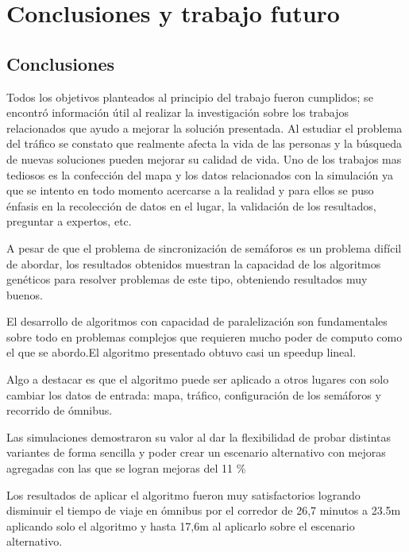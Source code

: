 \chapter{Conclusiones y trabajo futuro}

\section{Conclusiones}
Todos los objetivos planteados al principio del trabajo fueron cumplidos; se encontró información útil al realizar la investigación sobre los trabajos relacionados que ayudo a mejorar la solución presentada. 
Al estudiar el problema del tráfico se constato que realmente afecta la vida de las personas y la búsqueda de nuevas soluciones pueden mejorar su calidad de vida.
Uno de los trabajos mas tediosos es la confección del mapa y los datos relacionados con la simulación ya que se intento en todo momento acercarse a la realidad y para ellos se puso énfasis en la recolección de datos en el lugar, la validación de los resultados, preguntar a expertos, etc.



 
A pesar de que el problema de sincronización de semáforos es un problema difícil de abordar, los resultados obtenidos
muestran la capacidad de los algoritmos genéticos para resolver problemas de este tipo, obteniendo resultados muy buenos. 


El desarrollo de algoritmos con capacidad de paralelización son fundamentales sobre  todo en problemas complejos que requieren mucho poder de computo como el que se abordo.El algoritmo presentado obtuvo casi un speedup lineal.

Algo a destacar es que el algoritmo puede ser aplicado a otros lugares con solo cambiar los datos de entrada: mapa, tráfico, configuración de los semáforos y recorrido de ómnibus.

Las simulaciones demostraron su valor al dar la flexibilidad de probar distintas variantes de forma sencilla y poder crear un escenario alternativo con mejoras agregadas con las que se logran mejoras del 11 \%

Los resultados de aplicar el algoritmo fueron muy satisfactorios logrando disminuir el tiempo de viaje en ómnibus por el corredor de 26,7 minutos a 23.5m aplicando solo el algoritmo y hasta 17,6m al aplicarlo sobre el escenario alternativo.


